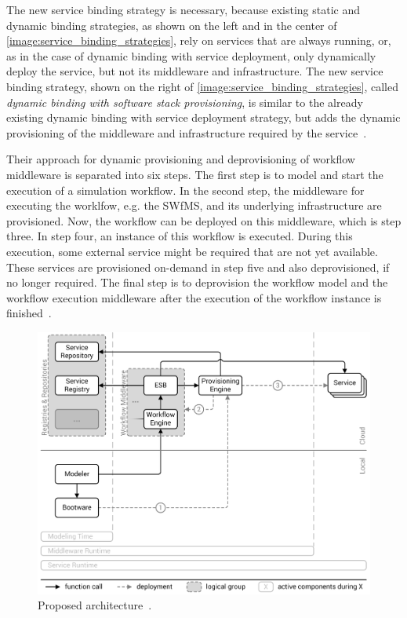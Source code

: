 The new service binding strategy is necessary, because existing static and dynamic binding strategies, as shown on the left and in the center of \autoref{image:service_binding_strategies}, rely on services that are always running, or, as in the case of dynamic binding with service deployment, only dynamically deploy the service, but not its middleware and infrastructure. The new service binding strategy, shown on the right of \autoref{image:service_binding_strategies}, called \textit{dynamic binding with software stack provisioning}, is similar to the already existing dynamic binding with service deployment strategy, but adds the dynamic provisioning of the middleware and infrastructure required by the service~\autocite{provisioning:ondemand}.

Their approach for dynamic provisioning and deprovisioning of workflow middleware is separated into six steps. The first step is to model and start the execution of a simulation workflow. In the second step, the middleware for executing the worklfow, e.g. the SWfMS, and its underlying infrastructure are provisioned. Now, the workflow can be deployed on this middleware, which is step three. In step four, an instance of this workflow is executed. During this execution, some external service might be required that are not yet available. These services are provisioned on-demand in step five and also deprovisioned, if no longer required. The final step is to deprovision the workflow model and the workflow execution middleware after the execution of the workflow instance is finished~\autocite{provisioning:ondemand}.

\begin{figure}[!htbp]
	\centering
	\includegraphics[resolution=600]{related/assets/original_architecture}
	\caption{Proposed architecture~\autocite[based on][]{provisioning:ondemand}.}
	\label{image:original_architecture}
\end{figure}

